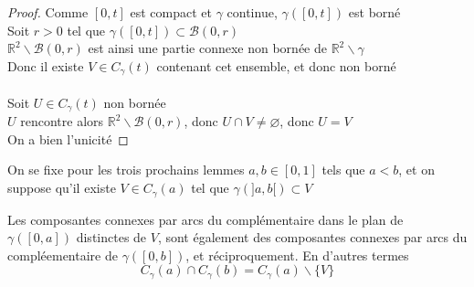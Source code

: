 \documentclass{article}
\begin{document}
\begin{flushleft}
\begin{proof}
    Comme $[0, t]$ est compact et $\gamma$ continue, $\gamma([0, t])$ est borné\\
    Soit $r > 0$ tel que $\gamma([0, t]) \subset \mathcal{B}(0, r)$\\
    $\mathbb{R}^2 \backslash \mathcal{B}(0, r)$ est ainsi une partie connexe non bornée de 
    $\mathbb{R}^2 \backslash \gamma$\\
    Donc il existe $V \in C_{\gamma}(t)$ contenant cet ensemble, et donc non borné
    \\~\\
    Soit $U \in C_{\gamma}(t)$ non bornée\\
    $U$ rencontre alors $\mathbb{R}^2 \backslash \mathcal{B}(0, r)$, donc $U \cap V \neq \varnothing$, 
    donc $U = V$\\
    On a bien l'unicité
\end{proof}

\vspace*{0.5cm}

On se fixe pour les trois prochains lemmes $a, b \in [0, 1]$ tels que $a < b$, et on suppose qu'il existe $V \in C_{\gamma}(a)$ tel que
$\gamma(]a, b[) \subset V$

\begin{tcolorbox}[colback = purple!20!white, colframe = purple!60!white, title = Lemme de préservation]
    Les composantes connexes par arcs du complémentaire dans le plan de $\gamma([0, a])$ distinctes de $V$,
    sont également des composantes connexes par arcs du compléementaire de $\gamma([0, b])$, et réciproquement. En d'autres termes
    \[ C_{\gamma}(a) \cap C_{\gamma}(b) = C_{\gamma}(a) \backslash \{V \}\]
\end{tcolorbox}


\end{flushleft}
\end{document}
